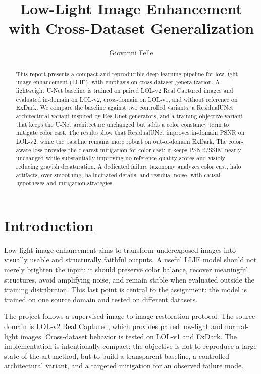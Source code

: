 \documentclass[10pt,twocolumn]{article}
\title{\vspace{-1.1cm}Low-Light Image Enhancement with Cross-Dataset Generalization}
\author{Giovanni Felle}
\date{}
\begin{document}
\maketitle

\begin{abstract}
This report presents a compact and reproducible deep learning pipeline for low-light image enhancement (LLIE), with emphasis on cross-dataset generalization. A lightweight U-Net baseline is trained on paired LOL-v2 Real Captured images and evaluated in-domain on LOL-v2, cross-domain on LOL-v1, and without reference on ExDark. We compare the baseline against two controlled variants: a ResidualUNet architectural variant inspired by Res-Unet generators, and a training-objective variant that keeps the U-Net architecture unchanged but adds a color constancy term to mitigate color cast. The results show that ResidualUNet improves in-domain PSNR on LOL-v2, while the baseline remains more robust on out-of-domain ExDark. The color-aware loss provides the clearest mitigation for color cast: it keeps PSNR/SSIM nearly unchanged while substantially improving no-reference quality scores and visibly reducing grayish desaturation. A dedicated failure taxonomy analyzes color cast, halo artifacts, over-smoothing, hallucinated details, and residual noise, with causal hypotheses and mitigation strategies.
\end{abstract}

\section{Introduction}
Low-light image enhancement aims to transform underexposed images into visually usable and structurally faithful outputs. A useful LLIE model should not merely brighten the input: it should preserve color balance, recover meaningful structures, avoid amplifying noise, and remain stable when evaluated outside the training distribution. This last point is central to the assignment: the model is trained on one source domain and tested on different datasets.

The project follows a supervised image-to-image restoration protocol. The source domain is LOL-v2 Real Captured, which provides paired low-light and normal-light images. Cross-dataset behavior is tested on LOL-v1 and ExDark. The implementation is intentionally compact: the objective is not to reproduce a large state-of-the-art method, but to build a transparent baseline, a controlled architectural variant, and a targeted mitigation for an observed failure mode.
\end{document}
